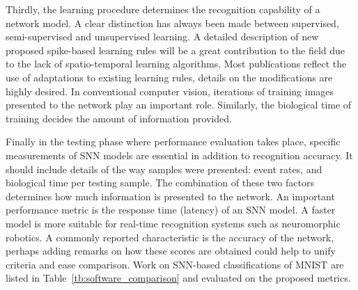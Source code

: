 Thirdly, the learning procedure determines the recognition capability of a network model.
A clear distinction has always been made between supervised, semi-supervised and unsupervised learning.
A detailed description of new proposed spike-based learning rules will be a great contribution to the field due to the lack of spatio-temporal learning algorithms.
Most publications reflect the use of adaptations to existing learning rules, details on the modifications are highly desired.
In conventional computer vision, iterations of training images presented to the network play an important role.
Similarly, the biological time of training decides the amount of information provided.



Finally in the testing phase where performance evaluation takes place, specific measurements of SNN models are essential in addition to recognition accuracy.
It should include details of the way samples were presented: event rates, and biological time per testing sample.
The combination of these two factors determines how much information is presented to the network.
An important performance metric is the response time (latency) of an SNN model.
A faster model is more suitable for real-time recognition systems such as neuromorphic robotics.
A commonly reported characteristic is the accuracy of the network, perhaps adding remarks on how these scores are obtained could help to unify criteria and ease comparison.
Work on SNN-based classifications of MNIST are listed in Table~\ref{tb:software_comparison} and evaluated on the proposed metrics.

